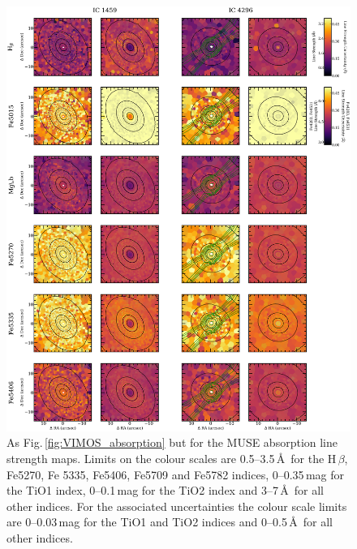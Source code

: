 		\begin{figure}
			\centering
			\includegraphics[height=0.81\textheight]{chapter4/muse/abs1.png}
			\caption[MUSE absorption line strength maps]{As Fig.\,\ref{fig:VIMOS_absorption} but for the MUSE absorption line strength maps. Limits on the colour scales are 0.5--3.5\,\AA\ for the H\,$\beta$, Fe5270, Fe 5335, Fe5406, Fe5709 and Fe5782 indices, 0--0.35\,mag for the TiO1 index, 0--0.1\,mag for the TiO2 index and 3--7\,\AA\ for all other indices. For the associated uncertainties the colour scale limits are 0--0.03\,mag for the TiO1 and TiO2 indices and 0--0.5\,\AA\ for all other indices.}
			\label{fig:MUSE_absorption}
		\end{figure}
